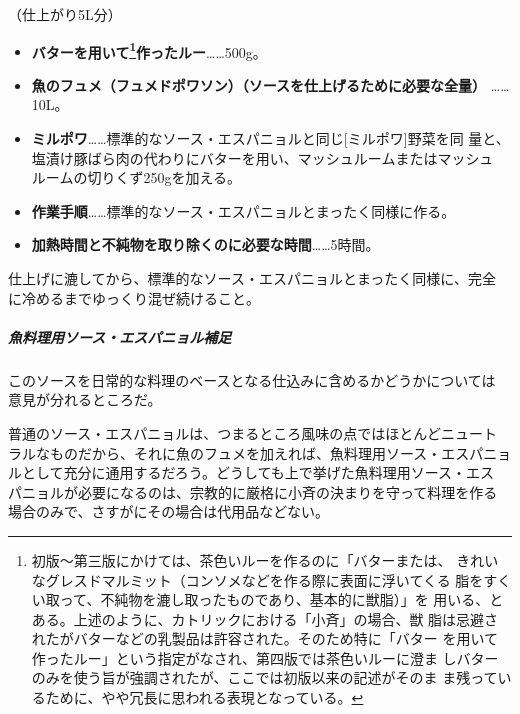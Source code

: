 \begin{recette}
（仕上がり5L分）

\begin{itemize}
\item
  \textbf{バターを用いて\footnote{初版〜第三版にかけては、茶色いルーを作るのに「バターまたは、
    きれいなグレスドマルミット（コンソメなどを作る際に表面に浮いてくる
    脂をすくい取って、不純物を漉し取ったものであり、基本的に獣脂）」を
    用いる、とある。上述のように、カトリックにおける「小斉」の場合、獣
    脂は忌避されたがバターなどの乳製品は許容された。そのため特に「バター
    を用いて作ったルー」という指定がなされ、第四版では茶色いルーに澄ま
    しバターのみを使う旨が強調されたが、ここでは初版以来の記述がそのま
    ま残っているために、やや冗長に思われる表現となっている。}作ったルー}\ldots{}\ldots{}500g。
\item
  \textbf{魚のフュメ（フュメドポワソン）（ソースを仕上げるために必要な全量）
  }\ldots{}\ldots{}10L。
\item
  \textbf{ミルポワ}\ldots{}\ldots{}標準的なソース・エスパニョルと同じ{[}ミルポワ{]}野菜を同
  量と、塩漬け豚ばら肉の代わりにバターを用い、マッシュルームまたはマッシュ
  ルームの切りくず250gを加える。
\item
  \textbf{作業手順}\ldots{}\ldots{}標準的なソース・エスパニョルとまったく同様に作る。
\item
  \textbf{加熱時間と不純物を取り除くのに必要な時間}\ldots{}\ldots{}5時間。
\end{itemize}

仕上げに漉してから、標準的なソース・エスパニョルとまったく同様に、完全
に冷めるまでゆっくり混ぜ続けること。

\maeaki

\hypertarget{ux9b5aux6599ux7406ux7528ux30bdux30fcux30b9ux30a8ux30b9ux30d1ux30cbux30e7ux30ebux88dcux8db3}{%
\subparagraph{魚料理用ソース・エスパニョル補足}\label{ux9b5aux6599ux7406ux7528ux30bdux30fcux30b9ux30a8ux30b9ux30d1ux30cbux30e7ux30ebux88dcux8db3}}

このソースを日常的な料理のベースとなる仕込みに含めるかどうかについては
意見が分れるところだ。

普通のソース・エスパニョルは、つまるところ風味の点ではほとんどニュート
ラルなものだから、それに魚のフュメを加えれば、魚料理用ソース・エスパニョ
ルとして充分に通用するだろう。どうしても上で挙げた魚料理用ソース・エス
パニョルが必要になるのは、宗教的に厳格に小斉の決まりを守って料理を作る
場合のみで、さすがにその場合は代用品などない。

\maeaki

\hypertarget{ux30bdux30fcux30b9ux30c9ux30a5ux30dfux30b0ux30e9ux30b9102009}{%
}
\end{recette}
